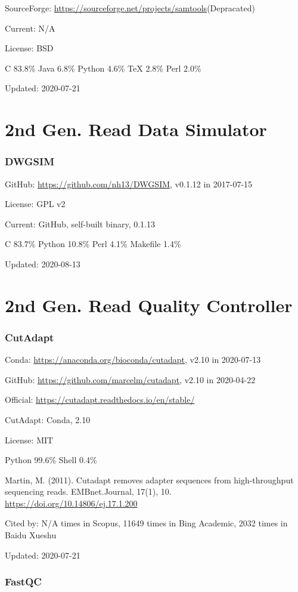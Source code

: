 \documentclass[]{article}
\newcommand{\de}{{\color{red}(Depracated)}}
\newcommand{\cb}[3]{\par Cited by: {\color{blue}\Huge #1} times in Scopus, {\color{blue}\Huge #2} times in Bing Academic, {\color{blue}\Huge #3} times in Baidu Xueshu}
\begin{document}
SourceForge: \url{https://sourceforge.net/projects/samtools}\de

Current: N/A

License: BSD

C 83.8\% Java 6.8\% Python 4.6\% TeX 2.8\% Perl 2.0\%

Updated: 2020-07-21

\part{2nd Gen. Read Data Simulator}

\section{DWGSIM}

GitHub: \url{https://github.com/nh13/DWGSIM}, v0.1.12 in 2017-07-15

License: GPL v2

Current: GitHub, self-built binary, 0.1.13

C 83.7\% Python 10.8\% Perl 4.1\% Makefile 1.4\%

Updated: 2020-08-13

\part{2nd Gen. Read Quality Controller}

\section{CutAdapt}

Conda: \url{https://anaconda.org/bioconda/cutadapt}, v2.10 in 2020-07-13

GitHub: \url{https://github.com/marcelm/cutadapt}, v2.10 in 2020-04-22

Official: \url{https://cutadapt.readthedocs.io/en/stable/}

CutAdapt: Conda, 2.10

License: MIT

Python 99.6\% Shell 0.4\%

Martin, M. (2011). Cutadapt removes adapter sequences from high-throughput sequencing reads. EMBnet.Journal, 17(1), 10. \url{https://doi.org/10.14806/ej.17.1.200} \cb{N/A}{11649}{2032}

Updated: 2020-07-21

\section{FastQC}
\end{document}
